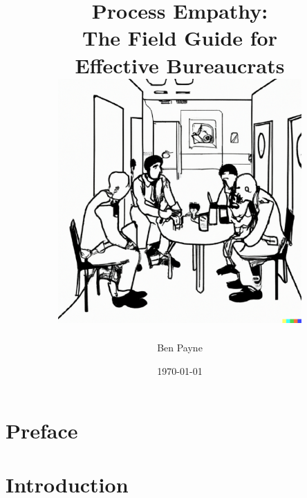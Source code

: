 \documentclass[openright]{book}
\title{\huge{Process Empathy:\\
The Field Guide for\\ Effective Bureaucrats}\\
\vfill
\includegraphics[width=0.7\textwidth]{images/bureaucrat_empathizing_with_coworkers_in_office_breakroom.pdf}
}
\author{\huge Ben Payne}
\date{\today}
\begin{document}





\begin{titlepage}
\maketitle
\thispagestyle{empty}
\end{titlepage}
\clearpage





\frontmatter %

\clearpage

\iftoggle{showminitoc}{\dominitoc}{} %
\hypertarget{contents}{}
\tableofcontents\label{sec:toc}

\chapter{Preface}

\mainmatter %


\chapter{Introduction\label{sec:introduction}}
\iftoggle{showbacktotoc}{{\footnotesize Back to the \hyperref[sec:toc]{Main Table of Contents}}}{}
\iftoggle{showminitoc}{\minitoc}{}
  
\end{document}
